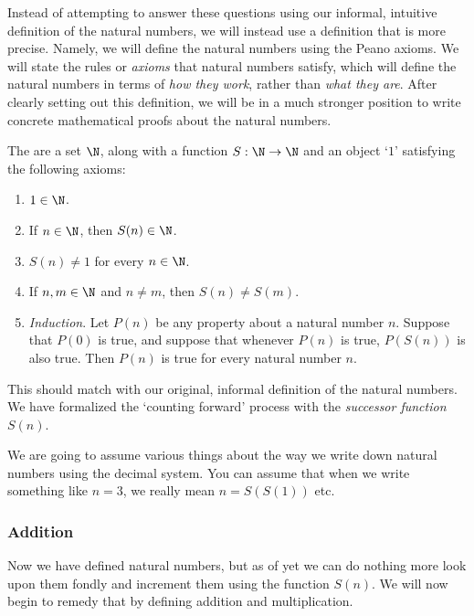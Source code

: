 Instead of attempting to answer these questions using our informal, intuitive definition of the natural numbers, we will instead use a definition that is more precise. Namely, we will define the natural numbers using the Peano axioms. We will state the rules or \emph{axioms} that natural numbers satisfy, which will define the natural numbers in terms of \emph{how they work}, rather than \emph{what they are}. After clearly setting out this definition, we will be in a much stronger position to write concrete mathematical proofs about the natural numbers.

\begin{definition}
	The  are a set $\N$, along with a function $S: \N \rightarrow \N$ and an object `$1$' satisfying the following axioms:
	\begin{enumerate}
		\item $1 \in \N$.
		\item If $n \in \N$, then $S(n) \in \N$.
		\item $S(n) \neq 1$ for every $n \in \N$.
		\item If $n, m \in \N$ and $n \neq m$, then $S(n) \neq S(m)$.
		\item \emph{Induction}. Let $P(n)$ be any property about a natural number $n$. Suppose that $P(0)$ is true, and suppose that whenever $P(n)$ is true, $P(S(n))$ is also true. Then $P(n)$ is true for every natural number $n$.
	\end{enumerate}
\end{definition}

This should match with our original, informal definition of the natural numbers. We have formalized the `counting forward' process with the \emph{successor function} $S(n)$.

\begin{remark}
	We are going to assume various things about the way we write down natural numbers using the decimal system. You can assume that when we write something like $n = 3$, we really mean $n = S(S(1))$ etc.
\end{remark}


\subsubsection{Addition}

Now we have defined natural numbers, but as of yet we can do nothing more look upon them fondly and increment them using the function $S(n)$. We will now begin to remedy that by defining addition and multiplication.

